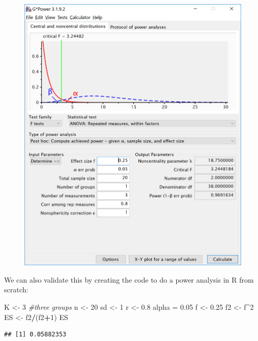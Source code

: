 \documentclass[]{article}
\newenvironment{Shaded}{\begin{snugshade}}{\end{snugshade}}
\newcommand{\DecValTok}[1]{\textcolor[rgb]{0.00,0.00,0.81}{#1}}
\newcommand{\FloatTok}[1]{\textcolor[rgb]{0.00,0.00,0.81}{#1}}
\newcommand{\StringTok}[1]{\textcolor[rgb]{0.31,0.60,0.02}{#1}}
\newcommand{\CommentTok}[1]{\textcolor[rgb]{0.56,0.35,0.01}{\textit{#1}}}
\newcommand{\OperatorTok}[1]{\textcolor[rgb]{0.81,0.36,0.00}{\textbf{#1}}}
\newcommand{\NormalTok}[1]{#1}
\begin{document}
\begin{figure}
\centering
\includegraphics{screenshots/gpower_12.png}
\caption{}
\end{figure}

We can also validate this by creating the code to do a power analysis in
R from scratch:

\begin{Shaded}
\begin{Highlighting}[]
\NormalTok{K <-}\StringTok{ }\DecValTok{3} \CommentTok{#three groups}
\NormalTok{n <-}\StringTok{ }\DecValTok{20}
\NormalTok{sd <-}\StringTok{ }\DecValTok{1}
\NormalTok{r <-}\StringTok{ }\FloatTok{0.8}
\NormalTok{alpha =}\StringTok{ }\FloatTok{0.05}
\NormalTok{f <-}\StringTok{ }\FloatTok{0.25}
\NormalTok{f2 <-}\StringTok{ }\NormalTok{f}\OperatorTok{^}\DecValTok{2}
\NormalTok{ES <-}\StringTok{ }\NormalTok{f2}\OperatorTok{/}\NormalTok{(f2}\OperatorTok{+}\DecValTok{1}\NormalTok{)}
\NormalTok{ES}
\end{Highlighting}
\end{Shaded}

\begin{verbatim}
## [1] 0.05882353
\end{verbatim}
\end{document}
